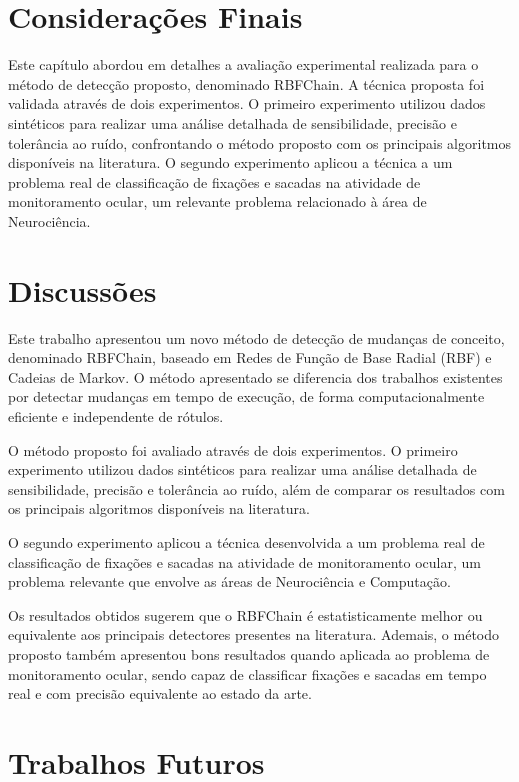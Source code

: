 \documentclass[msc, classic, a4paper]{ufbathesis}
\begin{document}
\section{Considerações Finais}

Este capítulo abordou em detalhes a avaliação experimental realizada para o método de detecção proposto, denominado RBFChain.
A técnica proposta foi validada através de dois experimentos.
O primeiro experimento utilizou dados sintéticos para realizar uma análise detalhada de sensibilidade, precisão e tolerância ao ruído, confrontando o método proposto com os principais algoritmos disponíveis na literatura.
O segundo experimento aplicou a técnica a um problema real de classificação de fixações e sacadas na atividade de monitoramento ocular, um relevante problema relacionado à área de Neurociência.

 \label{conclusoes_e_trabalhos_futuros}

\section{Discussões}

Este trabalho apresentou um novo método de detecção de mudanças de conceito, denominado RBFChain, baseado em Redes de Função de Base Radial (RBF) e Cadeias de Markov.
O método apresentado se diferencia dos trabalhos existentes por detectar mudanças em tempo de execução, de forma computacionalmente eficiente e independente de rótulos.

O método proposto foi avaliado através de dois experimentos.
O primeiro experimento utilizou dados sintéticos para realizar uma análise detalhada de sensibilidade, precisão e tolerância ao ruído, 
além de comparar os resultados com os principais algoritmos disponíveis na literatura.

O segundo experimento aplicou a técnica desenvolvida a um problema real de classificação de fixações e sacadas na atividade de monitoramento ocular, 
um problema relevante que envolve as áreas de Neurociência e Computação.

Os resultados obtidos sugerem que o RBFChain é estatisticamente melhor ou equivalente aos principais detectores presentes na literatura.
Ademais, o método proposto também apresentou bons resultados quando aplicada ao problema de monitoramento ocular, sendo capaz de classificar fixações e sacadas em tempo real e com precisão equivalente ao estado da arte.

\section{Trabalhos Futuros}
\end{document}
